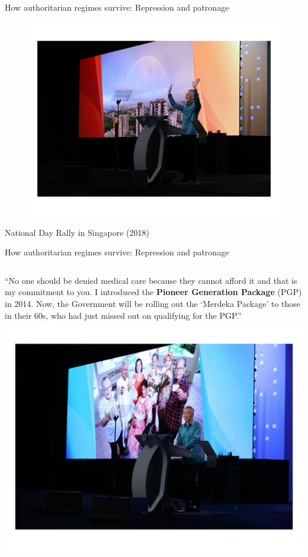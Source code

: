 \documentclass[10pt]{beamer}
\begin{document}
\begin{frame}{How authoritarian regimes survive: Repression and patronage}
	\begin{figure}
	\centering
	\includegraphics[scale=0.48]{Figs/lee1}
	\end{figure}
	\begin{center}
	National Day Rally in Singapore (2018)
	\end{center}
\end{frame}

\begin{frame}{How authoritarian regimes survive: Repression and patronage}
	\begin{columns}
	``No one should be denied medical care because they cannot afford it and that is my commitment to you. I introduced the \textbf{Pioneer Generation Package} (PGP) in 2014. Now, the Government will be rolling out the `Merdeka Package' to those in their 60s, who had just missed out on qualifying for the PGP.'' 	
    \centering
    \includegraphics[scale=0.45]{Figs/lee2}
    \end{columns}
\end{frame}
\end{document}
